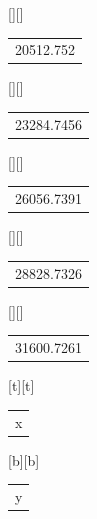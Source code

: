 \begin{psfrags}
[][]{\color[rgb]{0,0,0}\setlength{\tabcolsep}{0pt}\begin{tabular}{c}20512.752\end{tabular}}%
[][]{\color[rgb]{0,0,0}\setlength{\tabcolsep}{0pt}\begin{tabular}{c}23284.7456\end{tabular}}%
[][]{\color[rgb]{0,0,0}\setlength{\tabcolsep}{0pt}\begin{tabular}{c}26056.7391\end{tabular}}%
[][]{\color[rgb]{0,0,0}\setlength{\tabcolsep}{0pt}\begin{tabular}{c}28828.7326\end{tabular}}%
[][]{\color[rgb]{0,0,0}\setlength{\tabcolsep}{0pt}\begin{tabular}{c}31600.7261\end{tabular}}%
[t][t]{\color[rgb]{0,0,0}\setlength{\tabcolsep}{0pt}\begin{tabular}{c}x\end{tabular}}%
[b][b]{\color[rgb]{0,0,0}\setlength{\tabcolsep}{0pt}\begin{tabular}{c}y\end{tabular}}%


\end{psfrags}
